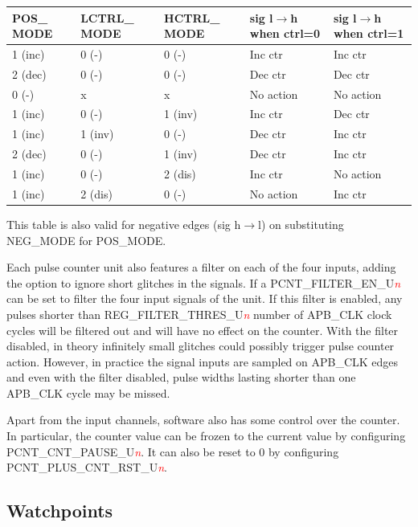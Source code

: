\documentclass[main\_\_EN.tex]{subfiles}
\begin{document}
\begin{longtable}{ | p{3cm} | p{3cm} | p{3cm} | p{3cm} | p{3cm} |  } \hline
\rowcolor{lightgray}
POS\_ MODE & LCTRL\_ MODE & HCTRL\_ MODE  & sig l$\rightarrow$h when ctrl=0 & sig l$\rightarrow$h when ctrl=1 \\ \hline
1 (inc) & 0 (-) & 0 (-) & Inc ctr & Inc ctr \\ \hline
2 (dec) & 0 (-) & 0 (-) & Dec ctr & Dec ctr \\ \hline
0 (-) & x & x & No action & No action \\ \hline
1 (inc) & 0 (-) & 1 (inv) & Inc ctr & Dec ctr \\ \hline
1 (inc) & 1 (inv) & 0 (-) & Dec ctr & Inc ctr \\ \hline
2 (dec) & 0 (-) & 1 (inv) & Dec ctr & Inc ctr \\ \hline
1 (inc) & 0 (-) & 2 (dis) & Inc ctr & No action \\ \hline
1 (inc) & 2 (dis) & 0 (-) & No action & Inc ctr \\ \hline
\end{longtable}

This table is also valid for negative edges (sig h$\rightarrow$l) on substituting NEG\_MODE for POS\_MODE.

Each pulse counter unit also features a filter on each of the four inputs, adding the option to ignore short glitches in the signals. If a PCNT\_FILTER\_EN\_U\textcolor{red}{\it{n}} can be set to filter the four input signals of the unit. If this filter is enabled, any pulses shorter than REG\_FILTER\_THRES\_U\textcolor{red}{\it{n}} number of APB\_CLK clock cycles will be filtered out and will have no effect on the counter. With the filter disabled, in theory infinitely small glitches could possibly trigger pulse counter action. However, in practice the signal inputs are sampled on APB\_CLK edges and even with the filter disabled, pulse widths lasting shorter than one APB\_CLK cycle may be missed.

Apart from the input channels, software also has some control over the counter. In particular, the counter value can be frozen to the current value by configuring PCNT\_CNT\_PAUSE\_U\textcolor{red}{\it{n}}. It can also be reset to 0 by configuring PCNT\_PLUS\_CNT\_RST\_U\textcolor{red}{\it{n}}.

\subsection{Watchpoints}\label{Watchpoints}
\end{document}
